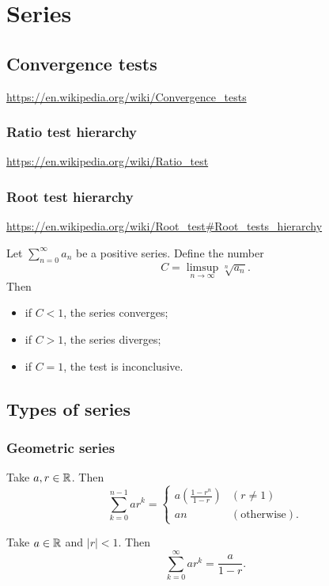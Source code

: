 \section{Series}

\subsection{Convergence tests}
\url{https://en.wikipedia.org/wiki/Convergence_tests}

\subsubsection{Ratio test hierarchy}
\url{https://en.wikipedia.org/wiki/Ratio_test}
\subsubsection{Root test hierarchy}
\url{https://en.wikipedia.org/wiki/Root_test#Root_tests_hierarchy}

\begin{proposition} \label{rootTest}
Let $\sum_{n=0}^\infty a_n$ be a positive series. Define the number
\[ C = \limsup_{n\to \infty}\sqrt[n]{a_n}. \]
Then
\begin{itemize}
\item if $C<1$, the series converges;
\item if $C>1$, the series diverges;
\item if $C=1$, the test is inconclusive.
\end{itemize}
\end{proposition}

\subsection{Types of series}
\subsubsection{Geometric series}
\begin{proposition}
Take $a,r\in \mathbb{R}$. Then
\[ \sum_{k=0}^{n-1}ar^k = \begin{cases}
a\left(\frac{1-r^n}{1-r}\right) & (r\neq 1) \\
an & (\text{otherwise}).
\end{cases} \]
\end{proposition}
\begin{corollary}
Take $a\in \mathbb{R}$ and $|r|<1$. Then
\[ \sum_{k=0}^\infty a r^k = \frac{a}{1-r}. \]
\end{corollary}

